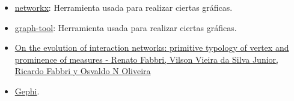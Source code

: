 \documentclass[11pt]{article}
\begin{document}
\begin{itemize}
	\item \href{https://networkx.github.io}{networkx}: Herramienta usada para realizar ciertas gráficas.
	\item \href{https://graph-tool.skewed.de}{graph-tool}: Herramienta usada para realizar ciertas gráficas.
	\item \href{https://www.researchgate.net/publication/258114132_On_the_evolution_of_interaction_networks_primitive_typology_of_vertex_and_prominence_of_measures}{On the evolution of interaction networks: primitive typology of vertex and prominence of measures - Renato Fabbri, Vilson Vieira da Silva Junior, Ricardo Fabbri y Osvaldo N Oliveira} 
	\item \href{https://gephi.org/}{Gephi}.
\end{itemize}
\end{document}
